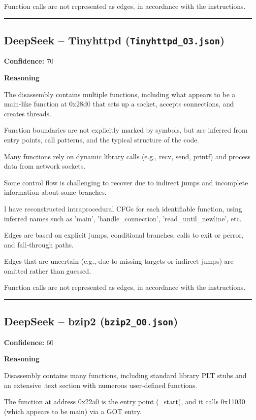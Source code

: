 Function calls are not represented as edges, in accordance with the instructions.

\bigskip
\hrule
\bigskip

\subsection{DeepSeek -- Tinyhttpd (\texttt{Tinyhttpd\_O3.json})}

\textbf{Confidence:} 70

\textbf{Reasoning}

The disassembly contains multiple functions, including what appears to be a main-like function at 0x28d0 that sets up a socket, accepts connections, and creates threads.

Function boundaries are not explicitly marked by symbols, but are inferred from entry points, call patterns, and the typical structure of the code.

Many functions rely on dynamic library calls (e.g., recv, send, printf) and process data from network sockets.

Some control flow is challenging to recover due to indirect jumps and incomplete information about some branches.

I have reconstructed intraprocedural CFGs for each identifiable function, using inferred names such as 'main', 'handle\_connection', 'read\_until\_newline', etc.

Edges are based on explicit jumps, conditional branches, calls to exit or perror, and fall-through paths.

Edges that are uncertain (e.g., due to missing targets or indirect jumps) are omitted rather than guessed.

Function calls are not represented as edges, in accordance with the instructions.

\bigskip
\hrule
\bigskip

\subsection{DeepSeek -- bzip2 (\texttt{bzip2\_O0.json})}

\textbf{Confidence:} 60

\textbf{Reasoning}

Disassembly contains many functions, including standard library PLT stubs and an extensive .text section with numerous user-defined functions.

The function at address 0x22a0 is the entry point (\_start), and it calls 0x11030 (which appears to be main) via a GOT entry.

